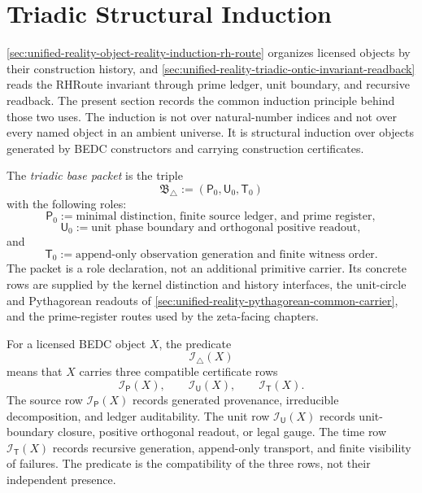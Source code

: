 \section{Triadic Structural Induction}
\label{sec:unified-reality-triadic-structural-induction}

\autoref{sec:unified-reality-object-reality-induction-rh-route} organizes
licensed objects by their construction history, and
\autoref{sec:unified-reality-triadic-ontic-invariant-readback} reads the
RHRoute invariant through prime ledger, unit boundary, and recursive
readback. The present section records the common induction principle
behind those two uses. The induction is not over natural-number indices
and not over every named object in an ambient universe. It is structural
induction over objects generated by BEDC constructors and carrying
construction certificates.

\begin{definition}
\label{def:unified-reality-triadic-base-packet}
The \emph{triadic base packet} is the triple
$$
\mathfrak B_{\triangle}
:=
\left(
\mathsf P_0,\mathsf U_0,\mathsf T_0
\right)
$$
with the following roles:
$$
\mathsf P_0
:=
\text{minimal distinction, finite source ledger, and prime register},
$$
$$
\mathsf U_0
:=
\text{unit phase boundary and orthogonal positive readout},
$$
and
$$
\mathsf T_0
:=
\text{append-only observation generation and finite witness order}.
$$
The packet is a role declaration, not an additional primitive carrier. Its
concrete rows are supplied by the kernel distinction and history
interfaces, the unit-circle and Pythagorean readouts of
\autoref{sec:unified-reality-pythagorean-common-carrier}, and the
prime-register routes used by the zeta-facing chapters.
\end{definition}

\begin{definition}
\label{def:unified-reality-triadic-construction-invariant}
For a licensed BEDC object $X$, the predicate
$$
\mathcal I_{\triangle}(X)
$$
means that $X$ carries three compatible certificate rows
$$
\mathcal I_{\mathsf P}(X),
\qquad
\mathcal I_{\mathsf U}(X),
\qquad
\mathcal I_{\mathsf T}(X).
$$
The source row $\mathcal I_{\mathsf P}(X)$ records generated provenance,
irreducible decomposition, and ledger auditability. The unit row
$\mathcal I_{\mathsf U}(X)$ records unit-boundary closure, positive
orthogonal readout, or legal gauge. The time row
$\mathcal I_{\mathsf T}(X)$ records recursive generation, append-only
transport, and finite visibility of failures. The predicate is the
compatibility of the three rows, not their independent presence.
\end{definition}

